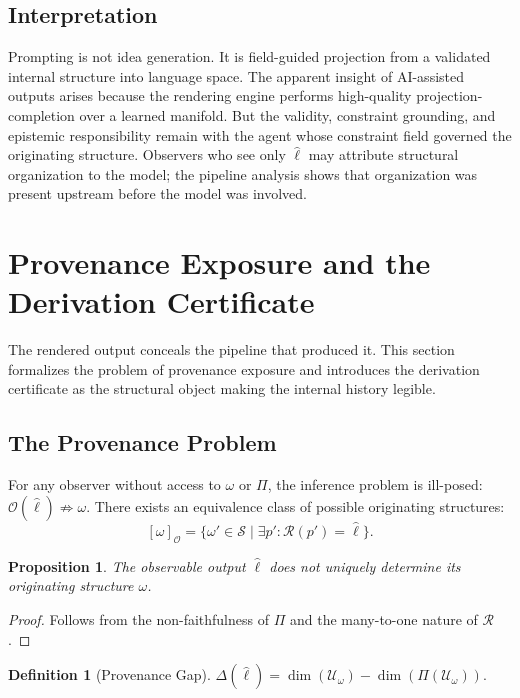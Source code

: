 \documentclass[12pt, a4paper]{article}
\theoremstyle{plain}
\newtheorem{proposition}[theorem]{Proposition}
\theoremstyle{definition}
\newtheorem{definition}[theorem]{Definition}
\theoremstyle{remark}
\begin{document}
\subsection{Interpretation}

Prompting is not idea generation. It is field-guided projection from a validated internal structure into language space. The apparent insight of AI-assisted outputs arises because the rendering engine performs high-quality projection-completion over a learned manifold. But the validity, constraint grounding, and epistemic responsibility remain with the agent whose constraint field governed the originating structure. Observers who see only $\hat{\ell}$ may attribute structural organization to the model; the pipeline analysis shows that organization was present upstream before the model was involved.

\section{Provenance Exposure and the Derivation Certificate}

The rendered output conceals the pipeline that produced it. This section formalizes the problem of provenance exposure and introduces the derivation certificate as the structural object making the internal history legible.

\subsection{The Provenance Problem}

For any observer without access to $\omega$ or $\Pi$, the inference problem is ill-posed: $\mathcal{O}(\hat{\ell}) \not\Rightarrow \omega$. There exists an equivalence class of possible originating structures:
\[
[\omega]_{\mathcal{O}} = \{ \omega' \in \mathcal{S} \mid \exists p' : \mathcal{R}(p') = \hat{\ell} \}.
\]

\begin{proposition}
The observable output $\hat{\ell}$ does not uniquely determine its originating structure $\omega$.
\end{proposition}

\begin{proof}
Follows from the non-faithfulness of $\Pi$ and the many-to-one nature of $\mathcal{R}$.
\end{proof}

\begin{definition}[Provenance Gap]
$\Delta(\hat{\ell}) = \dim(\mathcal{U}_\omega) - \dim(\Pi(\mathcal{U}_\omega))$.
\end{definition}
\end{document}
